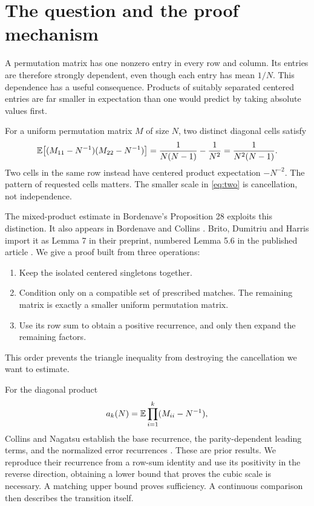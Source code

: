 \section{The question and the proof mechanism}

A permutation matrix has one nonzero entry in every row and column. Its entries are therefore strongly dependent, even though each entry has mean $1/N$. This dependence has a useful consequence. Products of suitably separated centered entries are far smaller in expectation than one would predict by taking absolute values first.

For a uniform permutation matrix $M$ of size $N$, two distinct diagonal cells satisfy
\begin{equation}\label{eq:two}
\mathbb E\bigl[(M_{11}-N^{-1})(M_{22}-N^{-1})\bigr]
=\frac{1}{N(N-1)}-\frac{1}{N^2}
=\frac{1}{N^2(N-1)}.
\end{equation}
Two cells in the same row instead have centered product expectation $-N^{-2}$. The pattern of requested cells matters. The smaller scale in \eqref{eq:two} is cancellation, not independence.

The mixed-product estimate in Bordenave's Proposition 28 \cite{Bordenave} exploits this distinction. It also appears in Bordenave and Collins \cite[Proposition 22]{BC}. Brito, Dumitriu and Harris import it as Lemma 7 in their preprint, numbered Lemma 5.6 in the published article \cite{BDH}. We give a proof built from three operations:
\begin{enumerate}
\item Keep the isolated centered singletons together.
\item Condition only on a compatible set of prescribed matches. The remaining matrix is exactly a smaller uniform permutation matrix.
\item Use its row sum to obtain a positive recurrence, and only then expand the remaining factors.
\end{enumerate}
This order prevents the triangle inequality from destroying the cancellation we want to estimate.

For the diagonal product
\[
a_k(N)=\mathbb E\prod_{i=1}^k(M_{ii}-N^{-1}),
\]
Collins and Nagatsu establish the base recurrence, the parity-dependent leading terms, and the normalized error recurrences \cite[Proposition 3.3]{CN}. These are prior results. We reproduce their recurrence from a row-sum identity and use its positivity in the reverse direction, obtaining a lower bound that proves the cubic scale is necessary. A matching upper bound proves sufficiency. A continuous comparison then describes the transition itself.

